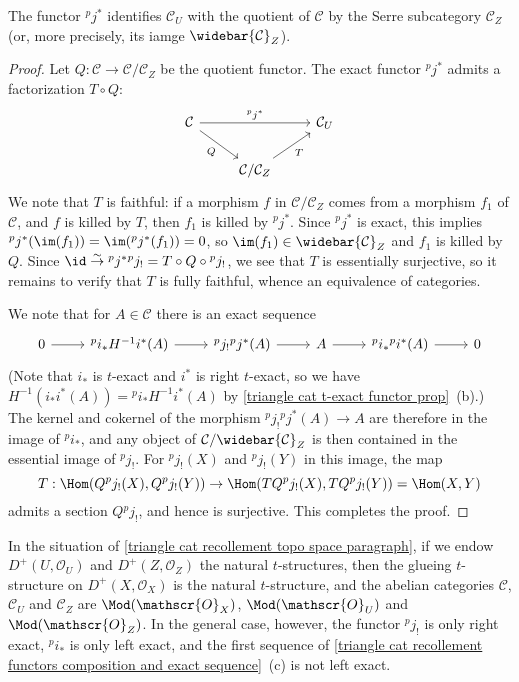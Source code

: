 \begin{proposition}\label{triangle cat recollement ^pj^* is quotient}
The functor ${^pj^*}$ identifies $\mathcal{C}_U$ with the quotient of $\mathcal{C}$ by the Serre subcategory $\mathcal{C}_Z$ (or, more precisely, its iamge $\widebar{\mathcal{C}}_Z$).
\end{proposition}
\begin{proof}
Let $Q:\mathcal{C}\to\mathcal{C}/\mathcal{C}_Z$ be the quotient functor. The exact functor ${^pj^*}$ admits a factorization $T\circ Q$:
\[\begin{tikzcd}
\mathcal{C}\ar[rd,swap,"Q"]\ar[rr,"{^pj^*}"]&&\mathcal{C}_U\\
&\mathcal{C}/\mathcal{C}_Z\ar[ru,swap,"T"]
\end{tikzcd}\]
We note that $T$ is faithful: if a morphism $f$ in $\mathcal{C}/\mathcal{C}_Z$ comes from a morphism $f_1$ of $\mathcal{C}$, and $f$ is killed by $T$, then $f_1$ is killed by ${^pj^*}$. Since ${^pj^*}$ is exact, this implies ${^pj^*}(\im(f_1))=\im({^pj^*}(f_1))=0$, so $\im(f_1)\in\widebar{\mathcal{C}}_Z$ and $f_1$ is killed by $Q$. Since $\id\stackrel{\sim}{\to}{^pj^*}{^pj_!}=T\circ Q\circ{^pj_!}$, we see that $T$ is essentially surjective, so it remains to verify that $T$ is fully faithful, whence an equivalence of categories.\par
We note that for $A\in\mathcal{C}$ there is an exact sequence
\[\begin{tikzcd}
0\ar[r]&{^pi_*}H^{-1}i^*(A)\ar[r]&{^pj_!}{^pj^*}(A)\ar[r]&A\ar[r]&{^pi_*}{^pi^*}(A)\ar[r]&0
\end{tikzcd}\]
(Note that $i_*$ is $t$-exact and $i^*$ is right $t$-exact, so we have $H^{-1}(i_*i^*(A))={^pi_*}H^{-1}i^*(A)$ by \cref{triangle cat t-exact functor prop}~(b).) The kernel and cokernel of the morphism ${^pj_!}{^pj^*}(A)\to A$ are therefore in the image of ${^pi_*}$, and any object of $\mathcal{C}/\widebar{\mathcal{C}}_Z$ is then contained in the essential image of ${^pj_!}$. For ${^pj_!}(X)$ and ${^pj_!}(Y)$ in this image, the map
\[T:\Hom(Q{^pj_!}(X),Q{^pj_!}(Y))\to\Hom(TQ{^pj_!}(X),TQ{^pj_!}(Y))=\Hom(X,Y)\]
admits a section $Q{^pj_!}$, and hence is surjective. This completes the proof.
\end{proof}

\begin{remark}
In the situation of \ref{triangle cat recollement topo space paragraph}, if we endow $D^+(U,\mathscr{O}_U)$ and $D^+(Z,\mathscr{O}_Z)$ the natural $t$-structures, then the glueing $t$-structure on $D^+(X,\mathscr{O}_X)$ is the natural $t$-structure, and the abelian categories $\mathcal{C}$, $\mathcal{C}_U$ and $\mathcal{C}_Z$ are $\Mod(\mathscr{O}_X)$, $\Mod(\mathscr{O}_U)$ and $\Mod(\mathscr{O}_Z)$. In the general case, however, the functor ${^pj_!}$ is only right exact, ${^pi_*}$ is only left exact, and the first sequence of \cref{triangle cat recollement functors composition and exact sequence}~(c) is not left exact.
\end{remark}

